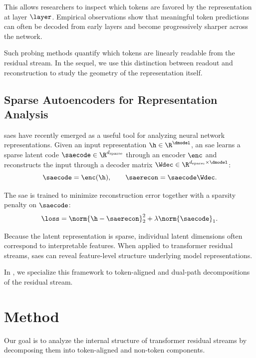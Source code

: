 \documentclass{article}
\begin{document}
This allows researchers to inspect which tokens are favored by the representation at layer $\layer$. Empirical observations show that meaningful token predictions can often be decoded from early layers and become progressively sharper across the network.

Such probing methods quantify which tokens are linearly readable from the residual stream. In the sequel, we use this distinction between readout and reconstruction to study the geometry of the representation itself.

\subsection{Sparse Autoencoders for Representation Analysis}

\Glspl{sae} have recently emerged as a useful tool for analyzing neural network representations. Given an input representation $\h \in \R^{\dmodel}$, an \gls{sae} learns a sparse latent code $\saecode \in \R^{d_\mathrm{sparse}}$ through an encoder $\enc$ and reconstructs the input through a decoder matrix $\Wdec \in \R^{d_\mathrm{sparse} \times \dmodel}$:
\begin{equation}
  \label{eq:sae-generic-reconstruction}
  \saecode = \enc(\h), \qquad
  \saerecon = \saecode \Wdec .
\end{equation}

The \gls{sae} is trained to minimize reconstruction error together with a sparsity penalty on $\saecode$:
\begin{equation}
  \label{eq:sae-generic-loss}
  \loss = \norm{\h - \saerecon}_2^2 + \lambda \norm{\saecode}_1 .
\end{equation}

Because the latent representation is sparse, individual latent dimensions often correspond to interpretable features. When applied to transformer residual streams, \glspl{sae} can reveal feature-level structure underlying model representations.

In , we specialize this framework to token-aligned and dual-path decompositions of the residual stream.

\section{Method}
\label{sec:method}

Our goal is to analyze the internal structure of transformer residual streams by decomposing them into token-aligned and non-token components.
\end{document}
